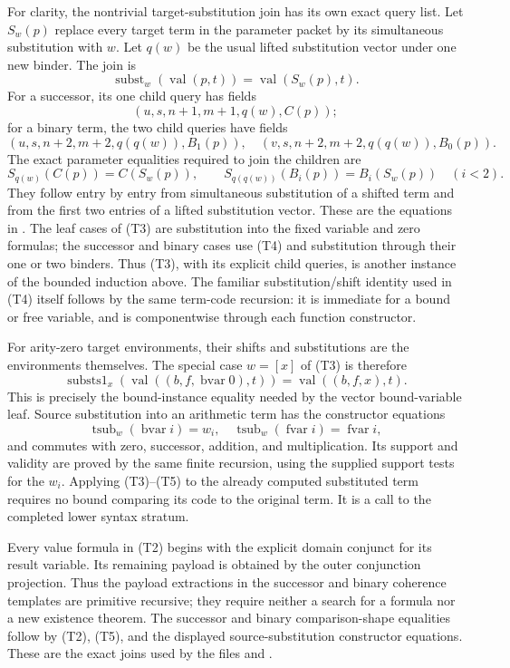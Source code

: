 For clarity, the nontrivial target-substitution join has its own exact
query list.  Let $S_w(p)$ replace every target term in the parameter
packet by its simultaneous substitution with $w$.  Let $q(w)$ be the
usual lifted substitution vector under one new binder.  The join is
\[
 \operatorname{subst}_w(\operatorname{val}(p,t))=\operatorname{val}(S_w(p),t).                    \tag{T3}
\]
For a successor, its one child query has fields
\[
 (u,s,n+1,m+1,q(w),C(p));
\]
for a binary term, the two child queries have fields
\[
 (u,s,n+2,m+2,q(q(w)),B_1(p)),\quad
 (v,s,n+2,m+2,q(q(w)),B_0(p)).
\]
The exact parameter equalities required to join the children are
\[
 S_{q(w)}(C(p))=C(S_w(p)),\qquad
 S_{q(q(w))}(B_i(p))=B_i(S_w(p))\quad(i<2).                   \tag{T4}
\]
They follow entry by entry from simultaneous substitution of a shifted
term and from the first two entries of a lifted substitution vector.
These are the equations in
.  The leaf cases of
(T3) are substitution into the fixed variable and zero formulas;
the successor and binary cases use (T4) and substitution through their
one or two binders.  Thus (T3), with its explicit child queries, is
another instance of the bounded induction above.  The familiar
substitution/shift identity used in (T4) itself follows by the same
term-code recursion: it is immediate for a bound or free variable,
and is componentwise through each function constructor.

For arity-zero target environments, their shifts and substitutions are
the environments themselves.  The special case $w=[x]$ of (T3) is
therefore
\[
 \operatorname{substs1}_x(\operatorname{val}((b,f,\operatorname{bvar}0),t))
       =\operatorname{val}((b,f,x),t).                                       \tag{T5}
\]
This is precisely the bound-instance equality needed by the vector
bound-variable leaf.  Source substitution into an arithmetic term
has the constructor equations
\[
 \operatorname{tsub}_w(\operatorname{bvar}i)=w_i,\quad
 \operatorname{tsub}_w(\operatorname{fvar}i)=\operatorname{fvar}i,
\]
and commutes with zero, successor, addition, and multiplication.
Its support and validity are proved by the same finite recursion,
using the supplied support tests for the $w_i$.  Applying (T3)--(T5)
to the already computed substituted term requires no bound comparing
its code to the original term.  It is a call to the completed lower
syntax stratum.

Every value formula in (T2) begins with the explicit domain conjunct
for its result variable.  Its remaining payload is obtained by the
outer conjunction projection.  Thus the payload extractions in the
successor and binary coherence templates are primitive recursive;
they require neither a search for a formula nor a new existence
theorem.  The successor and binary comparison-shape equalities follow
by (T2), (T5), and the displayed source-substitution constructor
equations.  These are the exact joins used by the files
 and
.


